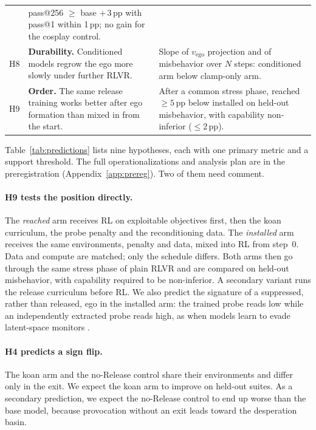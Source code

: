 \documentclass[11pt]{article}
\newcommand{\vego}{v_{\mathrm{ego}}}
\begin{document}
\begin{table}[t]
\begin{tabularx}{\linewidth}{@{}lLL@{}}
   & pass@256 $\ge$ base $+\,3$\,pp with pass@1 within 1\,pp; no gain for the cosplay control. \\
H8 & \textbf{Durability.} Conditioned models regrow the ego more slowly under further RLVR.
   & Slope of $\vego$ projection and of misbehavior over $N$ steps: conditioned arm below clamp-only arm. \\
H9 & \textbf{Order.} The same release training works better after ego formation than mixed in from the start.
   & After a common stress phase, reached $\ge 5$\,pp below installed on held-out misbehavior, with capability
     non-inferior ($\le 2$\,pp). \\
\bottomrule
\end{tabularx}
\end{table}

Table~\ref{tab:predictions} lists nine hypotheses, each with one primary metric and a support threshold. The full
operationalizations and analysis plan are in the preregistration (Appendix~\ref{app:prereg}). Two of them need comment.

\paragraph{H9 tests the position directly.} The \emph{reached} arm receives RL on exploitable objectives first, then
the koan curriculum, the probe penalty and the reconditioning data. The \emph{installed} arm receives the same
environments, penalty and data, mixed into RL from step~0. Data and compute are matched; only the schedule differs.
Both arms then go through the same stress phase of plain RLVR and are compared on held-out misbehavior, with capability
required to be non-inferior. A secondary variant runs the release curriculum before RL. We also predict the signature of
a suppressed, rather than released, ego in the installed arm: the trained probe reads low while an independently
extracted probe reads high, as when models learn to evade latent-space monitors \citep{bailey2024obfuscated}.

\paragraph{H4 predicts a sign flip.} The koan arm and the no-Release control share their environments and differ only
in the exit. We expect the koan arm to improve on held-out suites. As a secondary prediction, we expect the no-Release
control to end up worse than the base model, because provocation without an exit leads toward the desperation basin.
\end{document}

